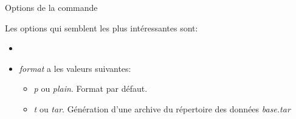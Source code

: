 
\begin{frame}{Options de la commande }

   Les options qui semblent les plus intéressantes sont:

\begin{itemize}

   \item {}
   \item \textit{format} a les valeurs suivantes:
   \begin{itemize}
      \item  \textit{p} ou \textit{plain}. Format par défaut. 
      \item  \textit{t} ou \textit{tar}. Génération d'une archive du répertoire des données \textit{base.tar}
   \end{itemize}

\end{itemize}

\begin{toile}
\end{toile}

\end{frame}


